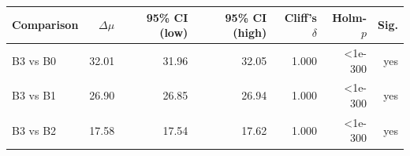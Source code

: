 \begin{tabular}{lrrrrrr}
\toprule
Comparison & $\Delta\mu$ & 95\% CI (low) & 95\% CI (high) & Cliff's $\delta$ & Holm-$p$ & Sig.\\
\midrule
B3 vs B0 & 32.01 & 31.96 & 32.05 & 1.000 & <1e-300 & yes\\
B3 vs B1 & 26.90 & 26.85 & 26.94 & 1.000 & <1e-300 & yes\\
B3 vs B2 & 17.58 & 17.54 & 17.62 & 1.000 & <1e-300 & yes\\
\bottomrule
\end{tabular}
